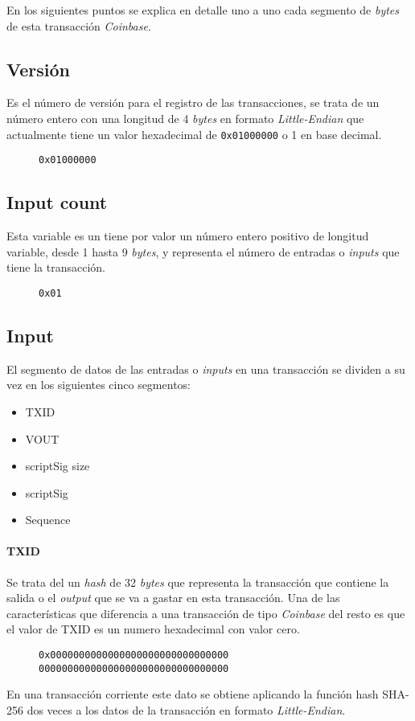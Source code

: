 \documentclass{article}
\begin{document}
    En los siguientes puntos se explica en detalle uno a uno cada segmento de \textit{bytes} de esta transacción \textit{Coinbase}.
    
    \subsection{Versión}
    Es el número de versión para el registro de las transacciones, se trata de un número entero con una longitud de 4 \textit{bytes} en formato \textit{Little-Endian} que actualmente tiene un valor hexadecimal de \texttt{0x01000000} o 1 en base decimal.
    \begin{figure}[H]
        \texttt{0x01000000}
    \end{figure}
    
    \subsection{Input count}
    Esta variable es un tiene por valor un número entero positivo de longitud variable, desde 1 hasta 9 \textit{bytes}, y representa el número de entradas o \textit{inputs} que tiene la transacción.
    \begin{figure}[H]
        \texttt{0x01}
    \end{figure}
    
    \subsection{Input}
    El segmento de datos de las entradas o \textit{inputs} en una transacción se dividen a su vez en los siguientes cinco segmentos:
    
    \begin{itemize}
    \item TXID
    \item VOUT
    \item scriptSig size
    \item scriptSig
    \item Sequence
    \end{itemize}
    
    \paragraph{TXID}
    Se trata del un \textit{hash} de 32 \textit{bytes} que representa la transacción que contiene la salida o el \textit{output} que se va a gastar en esta transacción. Una de las características que diferencia a una transacción de tipo \textit{Coinbase} del resto es que el valor de TXID es un numero hexadecimal con valor cero.
    \begin{figure}[H]
        \texttt{0x0000000000000000000000000000000} \\
        \texttt{000000000000000000000000000000000}
    \end{figure}
    En una transacción corriente este dato se obtiene aplicando la función hash SHA-256 dos veces a los datos de la transacción en formato \textit{Little-Endian}.
    
\end{document}
